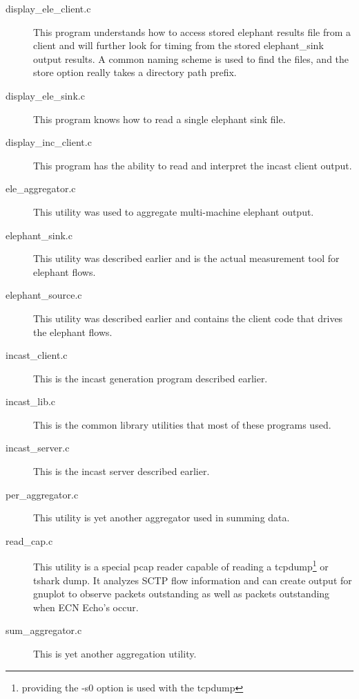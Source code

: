 \documentclass[12pt]{article}
\begin{document}
\begin{description}

\item[display\_ele\_client.c] This program understands how to access stored elephant results file from a
client and will further look for timing from the stored elephant\_sink output results. A common naming
scheme is used to find the files, and the store option really takes a directory path prefix. 

\item[display\_ele\_sink.c] This program knows how to read a single elephant sink file.

\item [display\_inc\_client.c] This program has the ability to read and interpret the incast client output.

\item [ele\_aggregator.c] This utility was used to aggregate multi-machine elephant output.

\item [elephant\_sink.c] This utility was described earlier and is the actual measurement tool for elephant flows.

\item [elephant\_source.c] This utility was described earlier and contains the client code that drives the elephant
flows.

\item [incast\_client.c] This is the incast generation program described earlier.

\item [incast\_lib.c] This is the common library utilities that most of these programs used.

\item [incast\_server.c] This is the incast server described earlier.

\item [per\_aggregator.c] This utility is yet another aggregator used in summing data.

\item [read\_cap.c] This utility is a special pcap reader capable of reading a tcpdump\footnote{providing the -s0 option
is used with the tcpdump} or tshark dump. It analyzes SCTP flow information and can create output for gnuplot
to observe packets outstanding as well as packets outstanding when ECN Echo's occur.

\item [sum\_aggregator.c] This is yet another aggregation utility.

\end{description}
\end{document}
